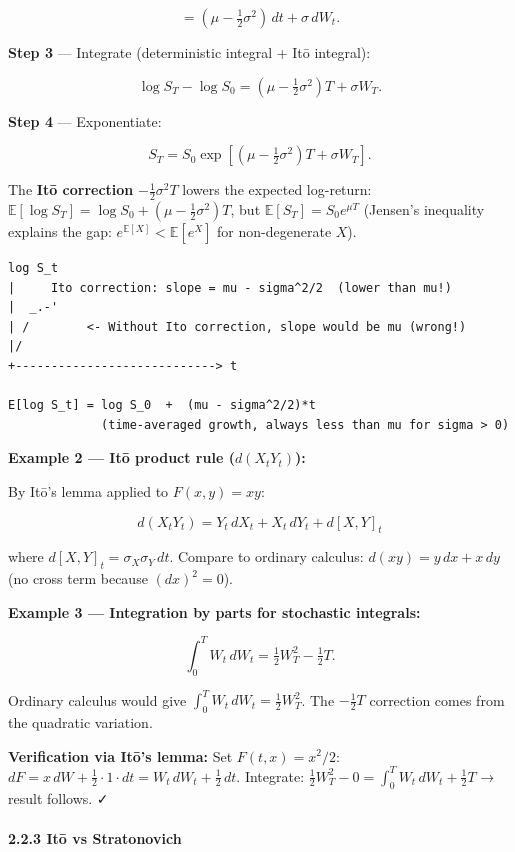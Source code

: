 \documentclass[11pt,a4paper]{article}
\begin{document}
\[= \left(\mu - \tfrac12\sigma^2\right)\,dt + \sigma\,dW_t.\]

\textbf{Step 3} --- Integrate (deterministic integral + Itō integral):

\[\log S_T - \log S_0 = \left(\mu-\tfrac12\sigma^2\right)T + \sigma W_T.\]

\textbf{Step 4} --- Exponentiate:

\[\boxed{S_T = S_0\exp\!\left[\left(\mu - \tfrac12\sigma^2\right)T + \sigma W_T\right].}\]

The \textbf{Itō correction} \(-\tfrac12\sigma^2 T\) lowers the expected log-return: \(\mathbb{E}[\log S_T] = \log S_0 + (\mu-\tfrac12\sigma^2)T\), but \(\mathbb{E}[S_T] = S_0 e^{\mu T}\) (Jensen's inequality explains the gap: \(e^{\mathbb{E}[X]} < \mathbb{E}[e^X]\) for non-degenerate \(X\)).

\begin{verbatim}
log S_t
|     Ito correction: slope = mu - sigma^2/2  (lower than mu!)
|  _.-'
| /        <- Without Ito correction, slope would be mu (wrong!)
|/
+----------------------------> t

E[log S_t] = log S_0  +  (mu - sigma^2/2)*t
             (time-averaged growth, always less than mu for sigma > 0)
\end{verbatim}

\textbf{Example 2 --- Itō product rule (\(d(X_t Y_t)\)):}

By Itō's lemma applied to \(F(x,y) = xy\):

\[d(X_t Y_t) = Y_t\,dX_t + X_t\,dY_t + d[X,Y]_t\]

where \(d[X,Y]_t = \sigma_X\sigma_Y\,dt\). Compare to ordinary calculus: \(d(xy) = y\,dx + x\,dy\) (no cross term because \((dx)^2=0\)).

\textbf{Example 3 --- Integration by parts for stochastic integrals:}

\[\int_0^T W_t\,dW_t = \tfrac12 W_T^2 - \tfrac12 T.\]

Ordinary calculus would give \(\int_0^T W_t\,dW_t = \tfrac12 W_T^2\). The \(-\tfrac12 T\) correction comes from the quadratic variation.

\textbf{Verification via Itō's lemma:} Set \(F(t,x) = x^2/2\): \(dF = x\,dW + \tfrac12\cdot 1 \cdot dt = W_t\,dW_t + \tfrac12\,dt\). Integrate: \(\tfrac12 W_T^2 - 0 = \int_0^T W_t\,dW_t + \tfrac12 T\) → result follows. ✓

\paragraph{2.2.3 Itō vs Stratonovich}\label{itux14d-vs-stratonovich}
\end{document}
